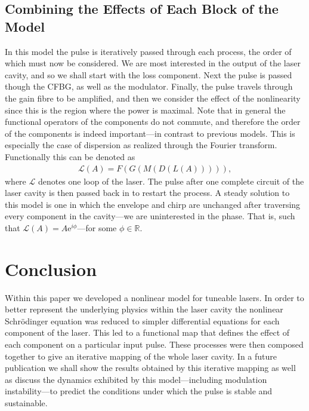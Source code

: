 \documentclass[graybox]{svmult}
\begin{document}
\subsection{Combining the Effects of Each Block of the Model}
\label{sec:effects}
In this model the pulse is iteratively passed through each process, the order of which must now be considered. We are most interested in the output of the laser cavity, and so we shall start with the loss component. Next the pulse is passed though the CFBG, as well as the modulator. Finally, the pulse travels through the gain fibre to be amplified, and then we consider the effect of the nonlinearity since this is the region where the power is maximal. Note that in general the functional operators of the components do not commute, and therefore the order of the components is indeed important---in contrast to previous models. This is especially the case of dispersion as realized through the Fourier transform. Functionally this can be denoted as
\begin{align}
	\mathcal{L}(A) = F(G(M(D(L(A))))),
\end{align}
where $\mathcal{L}$ denotes one loop of the laser. The pulse after one complete circuit of the laser cavity is then passed back in to restart the process. A steady solution to this model is one in which the envelope and chirp are unchanged after traversing every component in the cavity---we are uninterested in the phase. That is, such that $\mathcal{L}(A) = A \textrm{e}^{i \phi}$---for some $\phi \in \mathbb{R}$.

\section{Conclusion}
Within this paper we developed a nonlinear model for tuneable lasers. In order to better represent the underlying physics within the laser cavity the nonlinear Schr\"{o}dinger equation was reduced to simpler differential equations for each component of the laser. This led to a functional map that defines the effect of each component on a particular input pulse. These processes were then composed together to give an iterative mapping of the whole laser cavity. In a future publication we shall show the results obtained by this iterative mapping as well as discuss the dynamics exhibited by this model---including modulation instability---to predict the conditions under which the pulse is stable and sustainable.


\end{document}
